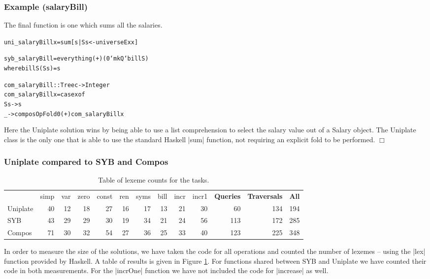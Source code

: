 \documentclass[preprint]{sigplanconf}
\newcounter{exmp}
\newcommand{\noexample}{\hfill$\Box$}
\newenvironment{code}{\begin{alltt}\small}{\end{alltt}}
\newenvironment{examplename}[1]
    {\subsubsection*{Example \arabic{exmp} (#1)}\refstepcounter{exmp}}
    {\noexample}
\newcommand{\ignore}{}
\begin{document}
\begin{examplename}{salaryBill}

The final function is one which sums all the salaries.

\ignore\begin{code}
uni_salaryBill x = sum [s | S s <- universeEx x]

syb_salaryBill = everything (+) (0 `mkQ` billS)
   where billS (S s) = s

com_salaryBill :: Tree c -> Integer
com_salaryBill x = case x of
    S s -> s
    _ -> composOpFold 0 (+) com_salaryBill x
\end{code}

Here the Uniplate solution wins by being able to use a list comprehension to select the salary value out of a Salary object. The Uniplate class is the only one that is able to use the standard Haskell |sum| function, not requiring an explicit fold to be performed.
\end{examplename}

\subsubsection{Uniplate compared to SYB and Compos}

\begin{table}
\caption{Table of lexeme counts for the tasks.}
\label{fig:lexemes}
\vspace{3mm}
\begin{tabular*}{\textwidth}{lrrrrrrrrrrrr}
 & simp & var & zero & const & ren & syms & bill & incr & incr1 & \textbf{Queries} & \textbf{Traversals} & \textbf{All} \\
Uniplate   & 40 & 12 & 18 & 27 & 16 & 17 & 13 & 21 & 30 &  60 & 134 & 194 \\
SYB        & 43 & 29 & 29 & 30 & 19 & 34 & 21 & 24 & 56 & 113 & 172 & 285 \\
Compos     & 71 & 30 & 32 & 54 & 27 & 36 & 25 & 33 & 40 & 123 & 225 & 348 \\
\hline
\end{tabular*}
\end{table}

In order to measure the size of the solutions, we have taken the code for all operations and counted the number of lexemes -- using the |lex| function provided by Haskell. A table of results is given in Figure \ref{fig:lexemes}. For functions shared between SYB and Uniplate we have counted their code in both measurements. For the |incrOne| function we have not included the code for |increase| as well.
\end{document}
